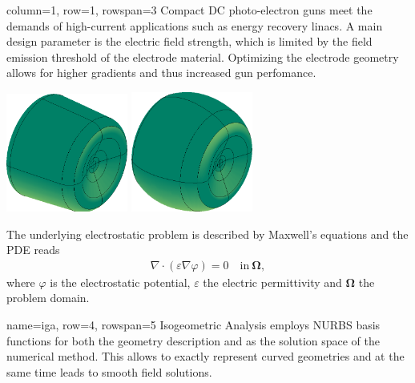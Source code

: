 \documentclass[
   accentcolor=9b,
   boxstyle=boxed
   ]{tudasciposter}
\begin{document}
\begin{tcbposter}[poster={columns=2, rows=8, spacing=1cm}]

\begin{posterboxenv}[title=Motivation]{column=1, row=1, rowspan=3}
   Compact DC photo-electron guns meet the demands of high-current applications such as energy recovery linacs. A main design parameter is the electric field strength, which is limited by the field emission threshold of the electrode material. Optimizing the electrode geometry allows for higher gradients and thus increased gun perfomance.
   \begin{center}
      \includegraphics[width=0.3\textwidth]{fig/electrode_init.png}
      \qquad
      \includegraphics[width=0.3\textwidth]{fig/electrode_opt.png}
   \end{center}
   The underlying electrostatic problem is described by Maxwell's equations and the PDE reads
   \begin{align*}
      \nabla \cdot (\varepsilon \nabla \varphi) = 0 \quad \mathrm{in}\ \boldsymbol{\Omega},
   \end{align*}
   where $\varphi$ is the electrostatic potential, $\varepsilon$ the electric permittivity and $\boldsymbol{\Omega}$ the problem domain.
\end{posterboxenv}

\begin{posterboxenv}[title=Isogeometric Analysis]{name=iga, row=4, rowspan=5}
   Isogeometric Analysis employs NURBS basis functions for both the geometry description and as the solution space of the numerical method. This allows to exactly represent curved geometries and at the same time leads to smooth field solutions.


\end{posterboxenv}
\end{tcbposter}
\end{document}
